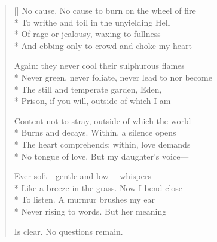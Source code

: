 \label{ch:lear_bv}
\settowidth{\versewidth}{Never green, never foliate, never lead to nor become}
\begin{verse}[\versewidth]
 No cause. No cause to burn on the wheel of fire\\*
To writhe and toil in the unyielding Hell\\*
Of rage or jealousy, waxing to fullness\\*
And ebbing only to crowd and choke my heart

Again: they never cool their sulphurous flames\\*
Never green, never foliate, never lead to nor become\\*
The still and temperate garden, Eden,\\*
Prison, if you will, outside of which I am

Content not to stray, outside of which the world\\*
Burns and decays. Within, a silence opens\\*
The heart comprehends; within, love demands\\*
No tongue of love. But my daughter's voice---

Ever soft---gentle and low--- whispers\\*
Like a breeze in the grass. Now I bend close\\*
To listen. A murmur brushes my ear\\*
Never rising to words. But her meaning

Is clear. No questions remain.
\end{verse}

